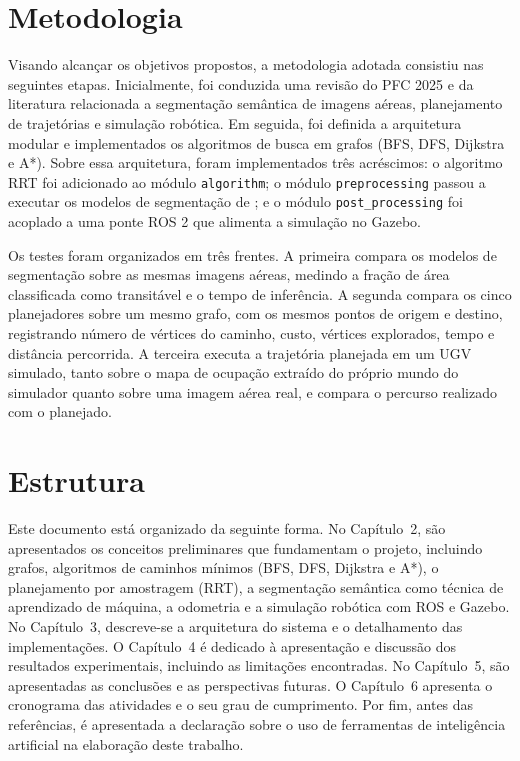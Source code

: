 \documentclass[
    12pt,
    openright,
    oneside,
    a4paper,
    english,
    brazil
]{abntex2}
\begin{document}
\section{Metodologia}

Visando alcançar os objetivos propostos, a metodologia adotada consistiu nas seguintes etapas. Inicialmente, foi conduzida uma revisão do PFC 2025 \cite{camelo2025} e da literatura relacionada a segmentação semântica de imagens aéreas, planejamento de trajetórias e simulação robótica. Em seguida, foi definida a arquitetura modular e implementados os algoritmos de busca em grafos (BFS, DFS, Dijkstra e A*). Sobre essa arquitetura, foram implementados três acréscimos: o algoritmo RRT foi adicionado ao módulo \texttt{algorithm}; o módulo \texttt{preprocessing} passou a executar os modelos de segmentação de \cite{junior2024_models}; e o módulo \texttt{post\_\allowbreak{}processing} foi acoplado a uma ponte ROS 2 que alimenta a simulação no Gazebo.

Os testes foram organizados em três frentes. A primeira compara os modelos de segmentação sobre as mesmas imagens aéreas, medindo a fração de área classificada como transitável e o tempo de inferência. A segunda compara os cinco planejadores sobre um mesmo grafo, com os mesmos pontos de origem e destino, registrando número de vértices do caminho, custo, vértices explorados, tempo e distância percorrida. A terceira executa a trajetória planejada em um UGV simulado, tanto sobre o mapa de ocupação extraído do próprio mundo do simulador quanto sobre uma imagem aérea real, e compara o percurso realizado com o planejado.

\section{Estrutura}

Este documento está organizado da seguinte forma. No Capítulo~2, são apresentados os conceitos preliminares que fundamentam o projeto, incluindo grafos, algoritmos de caminhos mínimos (BFS, DFS, Dijkstra e A*), o planejamento por amostragem (RRT), a segmentação semântica como técnica de aprendizado de máquina, a odometria e a simulação robótica com ROS e Gazebo. No Capítulo~3, descreve-se a arquitetura do sistema e o detalhamento das implementações. O Capítulo~4 é dedicado à apresentação e discussão dos resultados experimentais, incluindo as limitações encontradas. No Capítulo~5, são apresentadas as conclusões e as perspectivas futuras. O Capítulo~6 apresenta o cronograma das atividades e o seu grau de cumprimento. Por fim, antes das referências, é apresentada a declaração sobre o uso de ferramentas de inteligência artificial na elaboração deste trabalho.
\end{document}

